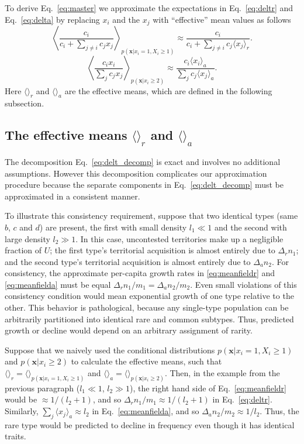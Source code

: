 \documentclass[12pt]{article}
\begin{document}
To derive Eq.~\eqref{eq:master} we approximate the expectations in Eq.~\eqref{eq:deltr} and Eq.~\eqref{eq:delta} by replacing $x_i$ and the $x_j$ with ``effective'' mean values as follows 
\begin{equation}
\left\langle\frac{c_i}{c_i +\sum_{j\neq i} c_j x_j}\right\rangle_{p({\mathbf x}|x_i=1,X_i\geq 1)}\approx \frac{c_i}{c_i +\sum_{j\neq i} c_j \langle x_j\rangle_r}.\label{eq:meanfieldr}
\end{equation}
\begin{equation}
\left\langle \frac{c_i x_i}{\sum_j c_j x_j} \right\rangle_{p({\mathbf x}|x_i\geq 2)}\approx  \frac{c_i \langle x_i \rangle_a}{\sum_j c_j \langle x_j\rangle_a}.\label{eq:meanfielda}
\end{equation}
Here $\langle \rangle_r$ and $\langle \rangle_a$ are the effective means, which are defined in the following subsection. 

\subsection*{The effective means $\langle \rangle_r$ and $\langle \rangle_a$}

The decomposition Eq.~\eqref{eq:delt_decomp} is exact and involves no additional assumptions. However this decomposition complicates our approximation procedure because the separate components in Eq.~\eqref{eq:delt_decomp} must be approximated in a consistent manner. 

To illustrate this consistency requirement, suppose that two identical types (same $b$, $c$ and $d$) are present, the first with small density $l_1\ll 1$ and the second with large density $l_2 \gg 1$. In this case, uncontested territories make up a negligible fraction of $U$; the first type's territorial acquisition is almost entirely due to $\Delta_r n_1$; and the second type's territorial acquisition is almost entirely due to $\Delta_a n_2$. For consistency, the approximate per-capita growth rates in \eqref{eq:meanfieldr} and \eqref{eq:meanfielda} must be equal $\Delta_r n_1/m_1 = \Delta_a n_2/m_2$. Even small violations of this consistency condition would mean exponential growth of one type relative to the other. This behavior is pathological, because any single-type population can be arbitrarily partitioned into identical rare and common subtypes. Thus, predicted growth or decline would depend on an arbitrary assignment of rarity.

Suppose that we naively used the conditional distributions $p({\mathbf x}|x_i=1,X_i\geq 1)$ and $p({\mathbf x}|x_i\geq 2)$ to calculate the effective means, such that $\langle \rangle_r=\langle \rangle_{p({\mathbf x}|x_i=1,X_i\geq 1)}$ and $\langle \rangle_a=\langle \rangle_{p({\mathbf x}|x_i\geq 2)}$. Then, in the example from the previous paragraph ($l_1\ll 1$, $l_2\gg 1$), the right hand side of Eq.~\eqref{eq:meanfieldr} would be $\approx 1/(l_2+1)$, and so $\Delta_r n_1/m_1 \approx 1/(l_2+1)$ in Eq.~\eqref{eq:deltr}. Similarly, $\sum_j \langle x_j\rangle_a \approx l_2$ in Eq.~\eqref{eq:meanfielda}, and so $\Delta_a n_2/m_2 \approx 1/l_2$. Thus, the rare type would be predicted to decline in frequency even though it has identical traits. 
\end{document}
